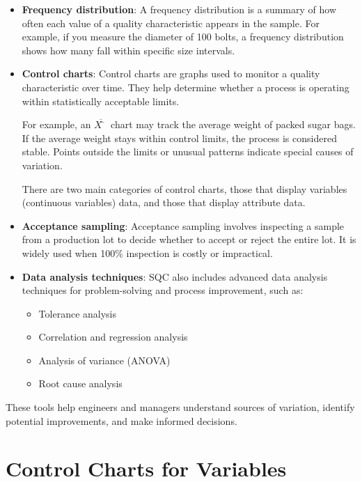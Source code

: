 \documentclass[twoside]{book}
\begin{document}
\begin{itemize}

\item \textbf{Frequency distribution}: A frequency distribution is a summary of how often each value of a quality characteristic appears in the sample. For example, if you measure the diameter of 100 bolts, a frequency distribution shows how many fall within specific size intervals.

\item \textbf{Control charts}: Control charts are graphs used to monitor a quality characteristic over time. They help determine whether a process is operating within statistically acceptable limits.

For example, an $ \overline{X̄} $ chart may track the average weight of packed sugar bags. If the average weight stays within control limits, the process is considered stable. Points outside the limits or unusual patterns indicate special causes of variation.

There are two main categories of control charts, those that display variables (continuous variables) data, and those that display attribute data.

\item \textbf{Acceptance sampling}: Acceptance sampling involves inspecting a sample from a production lot to decide whether to accept or reject the entire lot. It is widely used when 100\% inspection is costly or impractical.


\item \textbf{Data analysis techniques}: SQC also includes advanced data analysis techniques for problem-solving and process improvement, such as:
\begin{itemize}
    \item {Tolerance analysis}
    \item {Correlation and regression analysis}
    \item {Analysis of variance (ANOVA)}
    \item {Root cause analysis}
\end{itemize}

\end{itemize}

These tools help engineers and managers understand sources of variation, identify potential improvements, and make informed decisions.


\section{Control Charts for Variables}
\end{document}
